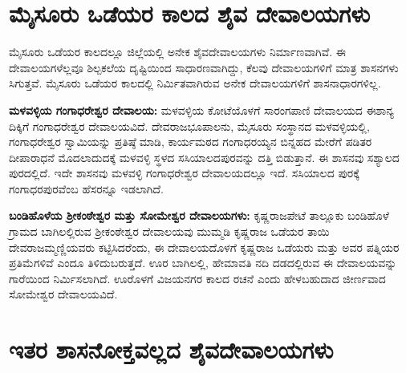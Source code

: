 \section*{ಮೈಸೂರು ಒಡೆಯರ ಕಾಲದ ಶೈವ ದೇವಾಲಯಗಳು}

ಮೈಸೂರು ಒಡೆಯರ ಕಾಲದಲ್ಲೂ ಜಿಲ್ಲೆಯಲ್ಲಿ ಅನೇಕ ಶೈವದೇವಾಲಯಗಳು ನಿರ್ಮಾಣವಾಗಿವೆ. ಈ ದೇವಾಲಯಗಳೆಲ್ಲವೂ ಶಿಲ್ಪಕಲೆಯ ದೃಷ್ಟಿಯಿಂದ ಸಾಧಾರಣವಾಗಿದ್ದು, ಕೆಲವು ದೇವಾಲಯಗಳಿಗೆ ಮಾತ್ರ ಶಾಸನಗಳು ಸಿಗುತ್ತವೆ. ಮೈಸೂರು ಒಡೆಯರ ಕಾಲದಲ್ಲಿ ನಿರ್ಮಿತವಾಗಿರುವ ಅನೇಕ ದೇವಾಲಯಗಳಿಗೆ ಶಾಸನಾಧಾರಗಳಿಲ್ಲ.

\textbf{ಮಳವಳ್ಳಿಯ ಗಂಗಾಧರೇಶ್ವರ ದೇವಾಲಯ:} ಮಳವಳ್ಳಿಯ ಕೋಟೆಯೊಳಗೆ ಸಾರಂಗಪಾಣಿ ದೇವಾಲಯದ ಈಶಾನ್ಯ ದಿಕ್ಕಿಗೆ ಗಂಗಾಧರೇಶ್ವರ ದೇವಾಲಯವಿದೆ. ದೇವರಾಜಭೂಪಾಲನು, ಮೈಸೂರು ಸಂಸ್ಥಾನದ ಮಳವಳ್ಳಿಯಲ್ಲಿ, ಗಂಗಾಧರೇಶ್ವರ ಸ್ವಾಮಿಯನ್ನು ಪ್ರತಿಷ್ಠೆ ಮಾಡಿ, ಕಾರ್ಯಮಠದ ಗಂಗಾಧರಯ್ಯನ ಬಿನ್ನಹದ ಮೇರೆಗೆ ಪಡಿತರ ದೀಪಾರಾಧನೆ ಮೊದಲಾದುದಕ್ಕೆ ಮಳವಳ್ಳಿ ಸ್ಥಳದ ಸಸಿಯಾಲದಪುರವನ್ನು ದತ್ತಿ ಬಿಡುತ್ತಾನೆ. ಈ ಶಾಸನವು ಸಶ್ಯಾಲದ ಪುರದಲ್ಲಿದೆ. ಇದೇ ಶಾಸನವು ಮಳವಳ್ಳಿ ಗಂಗಾಧರೇಶ್ವರ ದೇವಾಲಯದಲ್ಲೂ ಇದೆ. ಸಸಿಯಾಲದ ಪುರಕ್ಕೆ ಗಂಗಾಧರಪುರವೆಂಬ ಹೆಸರನ್ನೂ ಇಡಲಾಗಿದೆ.

\textbf{ಬಂಡಿಹೊಳೆಯ ಶ‍್ರೀಕಂಠೇಶ್ವರ ಮತ್ತು ಸೋಮೇಶ್ವರ ದೇವಾಲಯಗಳು:} ಕೃಷ್ಣರಾಜಪೇಟೆ ತಾಲ್ಲೂಕು ಬಂಡಿಹೊಳೆ ಗ್ರಾಮದ ಬಾಗಿಲಲ್ಲಿರುವ ಶ‍್ರೀಕಂಠೇಶ್ವರ ದೇವಾಲಯವು ಮುಮ್ಮಡಿ ಕೃಷ್ಣರಾಜ ಒಡೆಯರ ತಾಯಿ ದೇವರಾಜಮ್ಮಣ್ಣಿಯವರು ಕಟ್ಟಿಸಿದರೆಂದು, ಈ ದೇವಾಲಯದೊಳಗೆ ಕೃಷ್ಣರಾಜ ಒಡೆಯರು ಮತ್ತು ಅವರ ಪತ್ನಿಯರ ಪ್ರತಿಮೆಗಳಿವೆ ಎಂದೂ ತಿಳಿದು\-ಬರುತ್ತದೆ. ಊರ ಬಾಗಿಲಲ್ಲಿ, ಹೇಮಾವತಿ ನದಿ ದಡದಲ್ಲಿರುವ ಈ ದೇವಾಲಯವನ್ನು ಗಾರೆಯಿಂದ ನಿರ್ಮಿಸಲಾಗಿದೆ. ಊರೊಳಗೆ ವಿಜಯನಗರ ಕಾಲದ ರಚನೆ ಎಂದು ಹೇಳಬಹುದಾದ ಜೀರ್ಣವಾದ ಸೋಮೇಶ್ವರ ದೇವಾಲಯವಿದೆ.


\section*{ಇತರ ಶಾಸನೋಕ್ತವಲ್ಲದ ಶೈವದೇವಾಲಯಗಳು}

